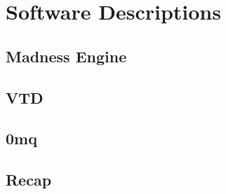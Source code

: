 \chapter{Software Descriptions}\label{ch:software}

\section{Madness Engine}\label{sc:software:madnessengine}

\section{VTD}\label{sc:software:vtd}

\section{0mq}\label{sc:software:0mq}

\section{Recap}\label{sc:software:recap}
